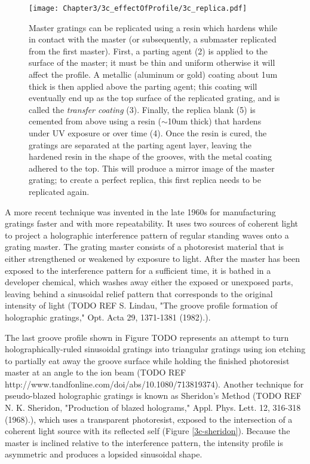 \begin{figure}[htbp] %
   \centering
   \texttt{[image: Chapter3/3c\_effectOfProfile/3c\_replica.pdf]}
   \caption{Master gratings can be replicated using a resin which hardens while in contact with the master (or subsequently, a submaster replicated from the first master).  First, a parting agent (2) is applied to the surface of the master; it must be thin and uniform otherwise it will affect the profile.  A metallic (aluminum or gold) coating about 1um thick is then applied above the parting agent; this coating will eventually end up as the top surface of the replicated grating, and is called the \emph{transfer coating} (3).  Finally, the replica blank (5) is cemented from above using a resin ($\sim$10um thick) that hardens under UV exposure or over time (4).  Once the resin is cured, the gratings are separated at the parting agent layer, leaving the hardened resin in the shape of the grooves, with the metal coating adhered to the top.  This will produce a mirror image of the master grating; to create a perfect replica, this first replica needs to be replicated again.}
   \label{3c-replication}
\end{figure}

A more recent technique was invented in the late 1960s for manufacturing gratings faster and with more repeatability.  It uses two sources of coherent light to project a  holographic interference pattern of regular standing waves onto a grating master.  The grating master consists of a photoresist material that is either strengthened or weakened by exposure to light.  After the master has been exposed to the interference pattern for a sufficient time, it is bathed in a developer chemical, which washes away either the exposed or unexposed parts, leaving behind a sinusoidal relief pattern that corresponds to the original intensity of light (TODO REF  S. Lindau, "The groove profile formation of holographic gratings," Opt. Acta 29, 1371-1381 (1982).).

The last groove profile shown in Figure TODO represents an attempt to turn holographically-ruled sinusoidal gratings into triangular gratings using ion etching to partially eat away the groove surface while holding the finished photoresist master at an angle to the ion beam (TODO REF http://www.tandfonline.com/doi/abs/10.1080/713819374).  Another technique for pseudo-blazed holographic gratings is known as Sheridon's Method (TODO REF N. K. Sheridon, "Production of blazed holograms," Appl. Phys. Lett. 12, 316-318 (1968).), which uses a transparent photoresist, exposed to the intersection of a coherent light source with its reflected self (Figure \ref{3c-sheridon}).  Because the master is inclined relative to the interference pattern, the intensity profile is asymmetric and produces a lopsided sinusoidal shape.

